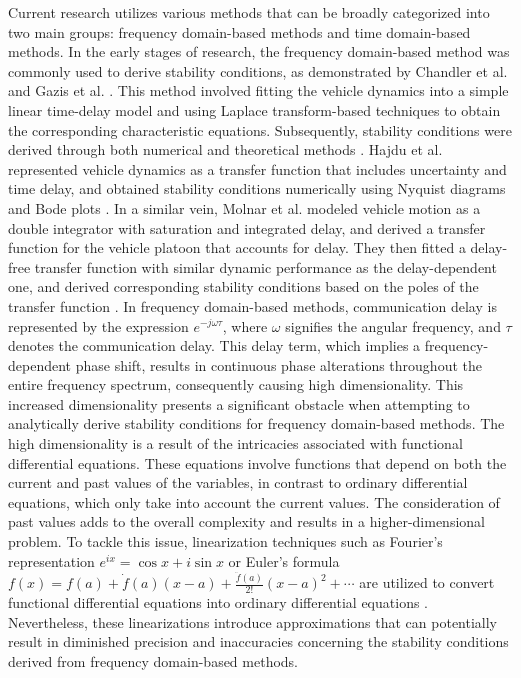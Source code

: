 \documentclass[a4paper]{cas-sc}
\begin{document}
Current research utilizes various methods that can be broadly categorized into two main groups: frequency domain-based methods and time domain-based methods. In the early stages of research, the frequency domain-based method was commonly used to derive stability conditions, as demonstrated by Chandler et al. \citep{chandler1958traffic} and Gazis et al. \citep{gazis1959car}. This method involved fitting the vehicle dynamics into a simple linear time-delay model and using Laplace transform-based techniques to obtain the corresponding characteristic equations. Subsequently, stability conditions were derived through both numerical and theoretical methods \citep{herman1959traffic,zhang1997stability}. Hajdu et al. represented vehicle dynamics as a transfer function that includes uncertainty and time delay, and obtained stability conditions numerically using Nyquist diagrams and Bode plots \citep{hajdu2016robust}. In a similar vein, Molnar et al. modeled vehicle motion as a double integrator with saturation and integrated delay, and derived a transfer function for the vehicle platoon that accounts for delay. They then fitted a delay-free transfer function with similar dynamic performance as the delay-dependent one, and derived corresponding stability conditions based on the poles of the transfer function \citep{molnar2022virtual}. In frequency domain-based methods, communication delay is represented by the expression $e^{-j\omega\tau}$, where $\omega$ signifies the angular frequency, and $\tau$ denotes the communication delay. This delay term, which implies a frequency-dependent phase shift, results in continuous phase alterations throughout the entire frequency spectrum, consequently causing high dimensionality. This increased dimensionality presents a significant obstacle when attempting to analytically derive stability conditions for frequency domain-based methods. The high dimensionality is a result of the intricacies associated with functional differential equations. These equations involve functions that depend on both the current and past values of the variables, in contrast to ordinary differential equations, which only take into account the current values. The consideration of past values adds to the overall complexity and results in a higher-dimensional problem. To tackle this issue, linearization techniques such as Fourier's representation $e^{ix} =\cos{x}+ i \sin{x}$ or Euler's formula $f(x)=f(a)+\dot f(a)(x-a)+\frac{\ddot f(a)}{2!}(x-a)^2+\cdots$ are utilized to convert functional differential equations into ordinary differential equations \citep{lhachemi2020feedback}. Nevertheless, these linearizations introduce approximations that can potentially result in diminished precision and inaccuracies concerning the stability conditions derived from frequency domain-based methods.
\end{document}
